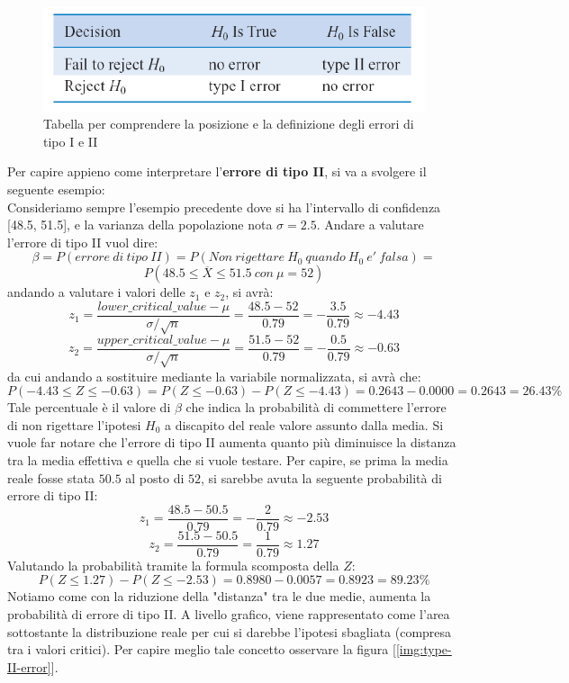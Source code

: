 \begin{figure}[h]
\centering
\includegraphics[width=.7\textwidth]{img/chapter-4/tabella-type-errors.png}
\caption{Tabella per comprendere la posizione e la definizione degli errori di tipo I e II}\label{tab:error-types}
\end{figure}

Per capire appieno come interpretare l'\textbf{errore di tipo II}, si va a svolgere il seguente esempio:
\\
Consideriamo sempre l'esempio precedente dove si ha l'intervallo di confidenza [48.5, 51.5], e la varianza della popolazione nota \(\sigma = 2.5\). 
Andare a valutare l'errore di tipo II vuol dire:
\[
\beta = P(errore\ di\ tipo\ II) = P(Non\ rigettare\ H_0\ quando\ H_0\ e'\ falsa)=
\]
\[
P(48.5 \leq \overline{X} \leq 51.5\ con\ \mu=52)
\]
andando a valutare i valori delle \(z_1\) e \(z_2\), si avrà:
\[
z_1 = \frac{lower\_critical\_value - \mu}{\sigma/\sqrt{n}} = \frac{48.5 - 52}{0.79} = -\frac{3.5}{0.79} \approx -4.43
\]
\[
z_2 = \frac{upper\_critical\_value - \mu}{\sigma/\sqrt{n}} = \frac{51.5 - 52}{0.79} = -\frac{0.5}{0.79} \approx -0.63
\]
da cui andando a sostituire mediante la variabile normalizzata, si avrà che:
\[
P(-4.43 \leq Z \leq -0.63) = P(Z \leq -0.63) - P(Z \leq -4.43) = 0.2643 - 0.0000 = 0.2643 = 26.43\%
\]
Tale percentuale è il valore di \(\beta\) che indica la probabilità di commettere l'errore di non rigettare l'ipotesi \(H_0\) a discapito del reale valore assunto dalla media.
Si vuole far notare che l'errore di tipo II aumenta quanto più diminuisce la distanza tra la media effettiva e quella che si vuole testare. Per capire, se prima la media reale fosse stata \(50.5\) al posto di \(52\), si sarebbe avuta la seguente probabilità di errore di tipo II:
\[
z_1 = \frac{48.5 - 50.5}{0.79} = -\frac{2}{0.79} \approx -2.53
\]
\[
z_2 = \frac{51.5 - 50.5}{0.79} = \frac{1}{0.79} \approx 1.27
\]
Valutando la probabilità tramite la formula scomposta della \(Z\):
\[
P(Z \leq 1.27) - P(Z \leq -2.53) = 0.8980 - 0.0057 = 0.8923 = 89.23\%
\]
Notiamo come con la riduzione della "distanza" tra le due medie, aumenta la probabilità di errore di tipo II. A livello grafico, viene rappresentato come l'area sottostante la distribuzione reale per cui si darebbe l'ipotesi sbagliata (compresa tra i valori critici). Per capire meglio tale concetto osservare la figura [\ref{img:type-II-error}].

